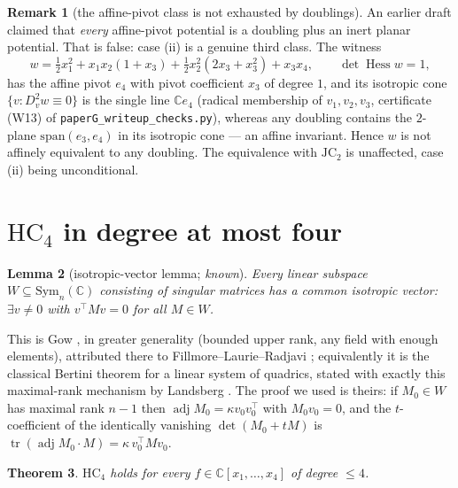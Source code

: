 \documentclass[11pt]{article}
\theoremstyle{plain}
\newtheorem{theorem}{Theorem}[section]
\newtheorem{lemma}[theorem]{Lemma}
\theoremstyle{definition}
\newtheorem{remark}[theorem]{Remark}
\newcommand{\C}{\mathbb{C}}
\newcommand{\Hess}{\operatorname{Hess}}
\newcommand{\adj}{\operatorname{adj}}
\newcommand{\HC}{\mathrm{HC}}
\newcommand{\JC}{\mathrm{JC}}
\begin{document}
\begin{remark}[the affine-pivot class is not exhausted by doublings]
\label{rem:notdoubling}
An earlier draft claimed that \emph{every} affine-pivot potential is a
doubling plus an inert planar potential. That is false: case (ii) is a
genuine third class. The witness
\[
w=\tfrac12x_1^2+x_1x_2(1+x_3)+\tfrac12x_2^2(2x_3+x_3^2)+x_3x_4,
\qquad\det\Hess w=1,
\]
has the affine pivot $e_4$ with pivot coefficient $x_3$ of degree $1$,
and its isotropic cone $\{v:D_v^2w\equiv0\}$ is the single line $\C e_4$
(radical membership of $v_1,v_2,v_3$, certificate (W13) of
\texttt{paperG\_writeup\_checks.py}), whereas any doubling contains the
$2$-plane $\mathrm{span}(e_3,e_4)$ in its isotropic cone --- an affine
invariant. Hence $w$ is not affinely equivalent to any doubling. The
equivalence with $\JC_2$ is unaffected, case (ii) being unconditional.
\end{remark}

\section{$\HC_4$ in degree at most four}

\begin{lemma}[isotropic-vector lemma; \emph{known}]\label{lem:iso}
Every linear subspace $W\subseteq\mathrm{Sym}_n(\C)$ consisting of
singular matrices has a common isotropic vector: $\exists v\ne0$ with
$v^\top Mv=0$ for all $M\in W$.
\end{lemma}

This is Gow \cite[Thm.~1]{Gow}, in greater generality (bounded upper rank,
any field with enough elements), attributed there to
Fillmore--Laurie--Radjavi \cite{FLR}; equivalently it is the classical
Bertini theorem for a linear system of quadrics, stated with exactly this
maximal-rank mechanism by Landsberg \cite{Landsberg}. The proof we used is
theirs: if $M_0\in W$ has maximal rank $n-1$ then $\adj M_0=\kappa
v_0v_0^\top$ with $M_0v_0=0$, and the $t$-coefficient of the identically
vanishing $\det(M_0+tM)$ is $\operatorname{tr}(\adj M_0\cdot M)=\kappa\,
v_0^\top Mv_0$.

\begin{theorem}\label{thm:deg4}
$\HC_4$ holds for every $f\in\C[x_1,\dots,x_4]$ of degree $\le4$.
\end{theorem}
\end{document}
